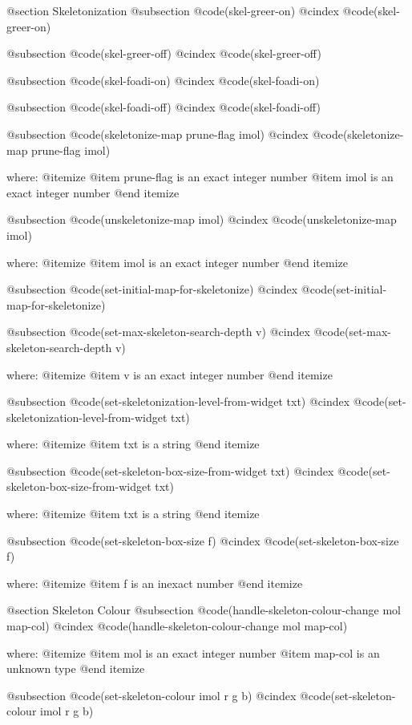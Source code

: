 @section Skeletonization 
@subsection @code{(skel-greer-on)}
@cindex @code{(skel-greer-on)}
 
@subsection @code{(skel-greer-off)}
@cindex @code{(skel-greer-off)}
 
@subsection @code{(skel-foadi-on)}
@cindex @code{(skel-foadi-on)}
 
@subsection @code{(skel-foadi-off)}
@cindex @code{(skel-foadi-off)}
 
@subsection @code{(skeletonize-map prune-flag imol)}
@cindex @code{(skeletonize-map prune-flag imol)}
 
where: 
 @itemize 
     @item prune-flag is an exact integer number
     @item imol is an exact integer number
 @end itemize


@subsection @code{(unskeletonize-map imol)}
@cindex @code{(unskeletonize-map imol)}
 
where: 
 @itemize 
     @item imol is an exact integer number
 @end itemize


@subsection @code{(set-initial-map-for-skeletonize)}
@cindex @code{(set-initial-map-for-skeletonize)}
 
@subsection @code{(set-max-skeleton-search-depth v)}
@cindex @code{(set-max-skeleton-search-depth v)}
 
where: 
 @itemize 
     @item v is an exact integer number
 @end itemize


@subsection @code{(set-skeletonization-level-from-widget txt)}
@cindex @code{(set-skeletonization-level-from-widget txt)}
 
where: 
 @itemize 
     @item txt is a string
 @end itemize


@subsection @code{(set-skeleton-box-size-from-widget txt)}
@cindex @code{(set-skeleton-box-size-from-widget txt)}
 
where: 
 @itemize 
     @item txt is a string
 @end itemize


@subsection @code{(set-skeleton-box-size f)}
@cindex @code{(set-skeleton-box-size f)}
 
where: 
 @itemize 
     @item f is an inexact number
 @end itemize



@section Skeleton Colour 
@subsection @code{(handle-skeleton-colour-change mol map-col)}
@cindex @code{(handle-skeleton-colour-change mol map-col)}
 
where: 
 @itemize 
     @item mol is an exact integer number
     @item map-col is an unknown type
 @end itemize


@subsection @code{(set-skeleton-colour imol r g b)}
@cindex @code{(set-skeleton-colour imol r g b)}
 
